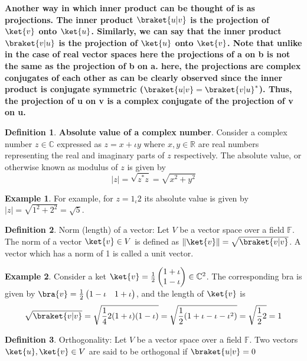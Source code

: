 \documentclass[12pt, oneside]{book}
\theoremstyle{definition}
\newtheorem{definition}{Definition}[section]
\theoremstyle{definition}
\newtheorem{example}{Example}[section]
\theoremstyle{remark}
\begin{document}
\textbf{Another way in which inner product can be thought of is as projections. The inner product $\braket{u|v}$ is the projection 
of $\ket{v}$ onto $\ket{u}$. Similarly, we can say that the inner product $\braket{v|u}$ is the projection of $\ket{u}$ onto $\ket{v}$. Note that unlike in 
the case of real vector spaces here the projections of a on b is not the same as the projection of b on a. here, the projections are complex conjugates of each other as 
can be clearly observed since the inner product is conjugate symmetric ($\braket{u|v}=\braket{v|u}^*$). Thus, the projection of u on v is a complex conjugate of 
the projection of v on u.}
\begin{definition}
    \textbf{Absolute value of a complex number}. Consider a complex number $z\in\mathbb{C}$ expressed as $z=x+\iota y$ where $x,y \in \mathbb{R}$ are real numbers representing the real and imaginary parts of $z$ respectively. The absolute value, or otherwise known as modulus of $z$ is given by
    \[
    |z|=\sqrt{z^*z}=\sqrt{x^2+y^2}
    \]
\end{definition}
\begin{example}
    For example, for $z=1_\iota 2$ its absolute value is given by $|z|=\sqrt{1^2+2^2}=\sqrt{5}$.
\end{example}

\begin{definition}
    Norm (length) of a vector: Let $V$ be a vector space over a field $\mathbb{F}$. The norm of a vector $\ket{v}\in V$ is defined as $\|\ket{v}\|=\sqrt{\braket{v|v}}$.
    A vector which has a norm of 1 is called a unit vector.
\end{definition}

\begin{example}
    Consider a ket $\ket{v}=\frac{1}{2}\begin{pmatrix} 1+\iota \\ 1-\iota \end{pmatrix} \in \mathbb{C}^2$. The corresponding bra is given by $\bra{v} =\frac{1}{2}\begin{pmatrix} 1-\iota & 1+\iota \end{pmatrix}$, and the length of $\ket{v}$ is
    \[
    \sqrt{\braket{v|v}} =\sqrt{\frac{1}{4}2(1+\iota)(1-\iota)}=\sqrt{\frac{1}{2}(1+\iota -\iota -\iota^2)}=\sqrt{\frac{1}{2}2}=1
    \]
\end{example}

\begin{definition}
    Orthogonality: Let $V$ be a vector space over a field $\mathbb{F}$. Two vectors $\ket{u},\ket{v}\in V$ are said to be orthogonal if $\braket{u|v}=0$
\end{definition}
\end{document}
